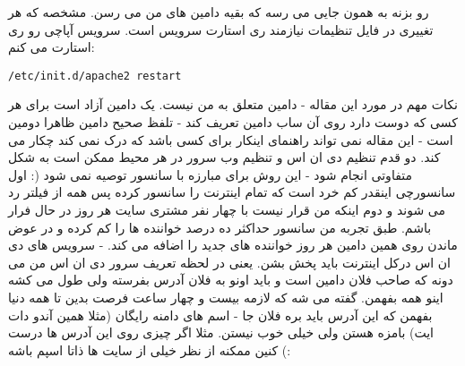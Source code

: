 رو بزنه به همون جایی می رسه که بقیه دامین های من می رسن. مشخصه که هر تغییری در فایل تنظیمات نیازمند ری استارت سرویس است. سرویس آپاچی رو ری استارت می کنم:
\begin{frameng}
\begin{lstlisting}
/etc/init.d/apache2 restart
\end{lstlisting}
\end{frameng}
نکات مهم در مورد این مقاله
- دامین  متعلق به من نیست. یک دامین آزاد است برای هر کسی که دوست دارد روی آن ساب دامین تعریف کند
- تلفظ صحیح دامین ظاهرا دومین است
- این مقاله نمی تواند راهنمای اینکار برای کسی باشد که درک نمی کند چکار می کند. دو قدم تنظیم دی ان اس و تنظیم وب سرور در هر محیط ممکن است به شکل متفاوتی انجام شود
- این روش برای مبارزه با سانسور توصیه نمی شود (: اول سانسورچی اینقدر کم خرد است که تمام اینترنت را سانسور کرده پس همه از فیلتر رد می شوند و دوم اینکه من قرار نیست با چهار نفر مشتری سایت هر روز در حال فرار باشم. طبق تجربه من سانسور حداکثر ده درصد خواننده ها را کم کرده و در عوض ماندن روی همین دامین هر روز خواننده های جدید را اضافه می کند.
- سرویس های دی ان اس درکل اینترنت باید پخش بشن. یعنی در لحظه تعریف سرور دی ان اس من می دونه که صاحب فلان دامین است و باید اونو به فلان آدرس بفرسته ولی طول می کشه اینو همه بفهمن. گفته می شه که لازمه بیست و چهار ساعت فرصت بدین تا همه دنیا بفهمن که این آدرس باید بره فلان جا
- اسم های دامنه رایگان (مثلا همین آندو دات ایت) بامزه هستن ولی خیلی خوب نیستن. مثلا اگر چیزی روی این آدرس ها درست کنین ممکنه از نظر خیلی از سایت ها ذاتا اسپم باشه (:
	